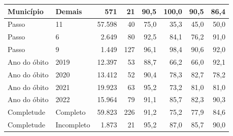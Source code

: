 \begin{table}[htbp]
{\begin{tabular}{llrrrrrr}
Munic\'ipio & Demais & 571 & 21 & 90{,}5 & 100{,}0 & 90{,}5 & 86{,}4 \\
\midrule
Passo & 11 & 57.598 & 40 & 75{,}0 & 35{,}3 & 45{,}0 & 50{,}0 \\
Passo & 6 & 2.649 & 80 & 92{,}5 & 84{,}1 & 76{,}2 & 91{,}0 \\
Passo & 9 & 1.449 & 127 & 96{,}1 & 98{,}4 & 90{,}6 & 92{,}0 \\
\midrule
Ano do \'obito & 2019 & 12.397 & 53 & 88{,}7 & 66{,}2 & 66{,}0 & 92{,}1 \\
Ano do \'obito & 2020 & 13.412 & 52 & 90{,}4 & 78{,}3 & 82{,}7 & 78{,}2 \\
Ano do \'obito & 2021 & 19.923 & 63 & 95{,}2 & 73{,}2 & 81{,}0 & 81{,}0 \\
Ano do \'obito & 2022 & 15.964 & 79 & 91{,}1 & 85{,}7 & 82{,}3 & 90{,}3 \\
\midrule
Completude & Completo & 59.823 & 226 & 91{,}2 & 75{,}2 & 77{,}9 & 84{,}6 \\
Completude & Incompleto & 1.873 & 21 & 95{,}2 & 87{,}0 & 85{,}7 & 90{,}0 \\
\bottomrule
\end{tabular}}
\end{table}
